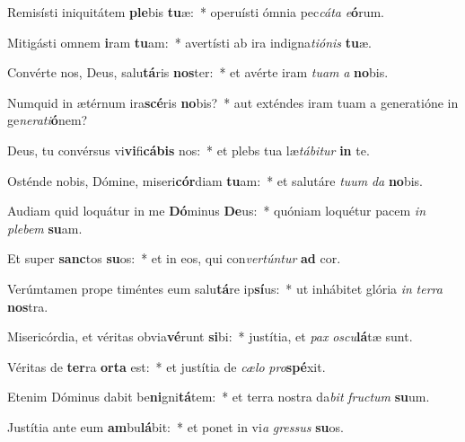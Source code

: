 \item Remisísti iniquitátem \textbf{ple}bis \textbf{tu}æ:~* operuísti ómnia pec\textit{cá}\textit{ta} \textit{e}\textbf{ó}rum.
\item Mitigásti omnem \textbf{i}ram \textbf{tu}am:~* avertísti ab ira indigna\textit{ti}\textit{ó}\textit{nis} \textbf{tu}æ.
\item Convérte nos, Deus, salu\textbf{tá}ris \textbf{nos}ter:~* et avérte iram \textit{tu}\textit{am} \textit{a} \textbf{no}bis.
\item Numquid in ætérnum ira\textbf{scé}ris \textbf{no}bis?~* aut exténdes iram tuam a generatióne in ge\textit{ne}\textit{ra}\textit{ti}\textbf{ó}nem?
\item Deus, tu convérsus vi\textbf{vi}fi\textbf{cá}\textbf{bis} nos:~* et plebs tua læ\textit{tá}\textit{bi}\textit{tur} \textbf{in} te.
\item Osténde nobis, Dómine, miseri\textbf{cór}diam \textbf{tu}am:~* et salutáre \textit{tu}\textit{um} \textit{da} \textbf{no}bis.
\item Audiam quid loquátur in me \textbf{Dó}minus \textbf{De}us:~* quóniam loquétur pacem \textit{in} \textit{ple}\textit{bem} \textbf{su}am.
\item Et super \textbf{sanc}tos \textbf{su}os:~* et in eos, qui con\textit{ver}\textit{tún}\textit{tur} \textbf{ad} cor.
\item Verúmtamen prope timéntes eum salu\textbf{tá}re ip\textbf{sí}us:~* ut inhábitet glória \textit{in} \textit{ter}\textit{ra} \textbf{nos}tra.
\item Misericórdia, et véritas obvia\textbf{vé}runt \textbf{si}bi:~* justítia, et \textit{pax} \textit{os}\textit{cu}\textbf{lá}tæ sunt.
\item Véritas de \textbf{ter}ra \textbf{or}\textbf{ta} est:~* et justítia de \textit{cæ}\textit{lo} \textit{pro}\textbf{spé}xit.
\item Etenim Dóminus dabit be\textbf{ni}gni\textbf{tá}tem:~* et terra nostra da\textit{bit} \textit{fruc}\textit{tum} \textbf{su}um.
\item Justítia ante eum \textbf{am}bu\textbf{lá}bit:~* et ponet in vi\textit{a} \textit{gres}\textit{sus} \textbf{su}os.
